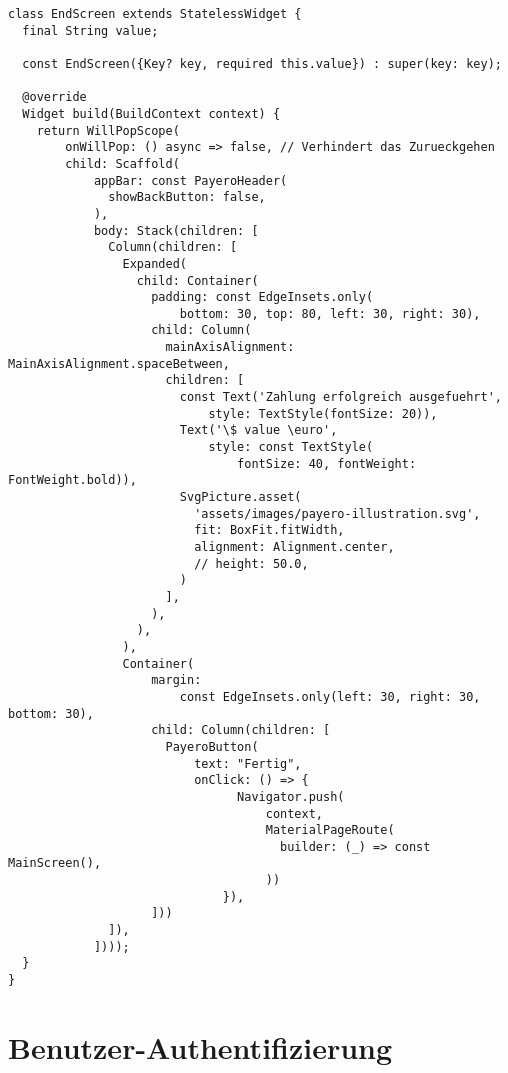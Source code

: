 \begin{lstlisting}[caption={EndScreen bei erfolgreichem Bezahlvorgang}]
  class EndScreen extends StatelessWidget {
  final String value;

  const EndScreen({Key? key, required this.value}) : super(key: key);

  @override
  Widget build(BuildContext context) {
    return WillPopScope(
        onWillPop: () async => false, // Verhindert das Zurueckgehen
        child: Scaffold(
            appBar: const PayeroHeader(
              showBackButton: false,
            ),
            body: Stack(children: [
              Column(children: [
                Expanded(
                  child: Container(
                    padding: const EdgeInsets.only(
                        bottom: 30, top: 80, left: 30, right: 30),
                    child: Column(
                      mainAxisAlignment: MainAxisAlignment.spaceBetween,
                      children: [
                        const Text('Zahlung erfolgreich ausgefuehrt',
                            style: TextStyle(fontSize: 20)),
                        Text('\$ value \euro',
                            style: const TextStyle(
                                fontSize: 40, fontWeight: FontWeight.bold)),
                        SvgPicture.asset(
                          'assets/images/payero-illustration.svg',
                          fit: BoxFit.fitWidth,
                          alignment: Alignment.center,
                          // height: 50.0,
                        )
                      ],
                    ),
                  ),
                ),
                Container(
                    margin:
                        const EdgeInsets.only(left: 30, right: 30, bottom: 30),
                    child: Column(children: [
                      PayeroButton(
                          text: "Fertig",
                          onClick: () => {
                                Navigator.push(
                                    context,
                                    MaterialPageRoute(
                                      builder: (_) => const MainScreen(),
                                    ))
                              }),
                    ]))
              ]),
            ])));
  }
}
\end{lstlisting}

\section{Benutzer-Authentifizierung}

